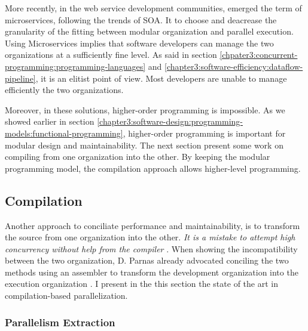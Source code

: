 More recently, in the web service development communities, emerged the term of microservices, following the trends of SOA.
It to choose and deacrease the granularity of the fitting between modular organization and parallel execution.
Using Microservices implies that software developers can manage the two organizations at a sufficiently fine level.
As said in section \ref{chpater3:concurrent-programming:programming-languages} and \ref{chapter3:software-efficiency:dataflow-pipeline}, it is an elitist point of view.
Most developers are unable to manage efficiently the two organizations.

Moreover, in these solutions, higher-order programming is impossible.
As we showed earlier in section \ref{chapter3:software-design:programming-models:functional-programming}, higher-order programming is important for modular design and maintainability.
The next section present some work on compiling from one organization into the other.
By keeping the modular programming model, the compilation approach allows higher-level programming. 

\subsection{Compilation}


Another approach to conciliate performance and maintainability, is to transform the source from one organization into the other.
\textit{It is a mistake to attempt high concurrency without help from the compiler} \cite{Behren2003}.
When showing the incompatibility between the two organization, D. Parnas already advocated conciling the two methods using an assembler to transform the development organization into the execution organization \cite{Parnas1972}.
I present in the this section the state of the art in compilation-based parallelization.


\subsubsection{Parallelism Extraction}

